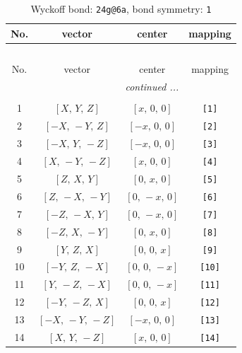 \documentclass[fleqn,8pt]{jsarticle}
\begin{document}
\begin{longtable}{cccc}
\caption{Wyckoff bond: {\tt 24g@6a}, bond symmetry: {\tt 1}}
 \\
 \hline \hline
No. & vector & center & mapping \\ \hline \endfirsthead

\multicolumn{3}{l}{\tablename\ \thetable{}} \\
 \hline \hline
No. & vector & center & mapping \\ \hline \endhead

 \hline \hline
\multicolumn{3}{r}{\footnotesize\it continued ...} \\ \endfoot

 \hline \hline
\multicolumn{3}{r}{} \\ \endlastfoot

1 & $\left[ X,\, Y,\, Z \right]$ & $\left[ x,\, 0,\, 0 \right]$ & {\tt [1]} \\ \hline
2 & $\left[ - X,\, - Y,\, Z \right]$ & $\left[ - x,\, 0,\, 0 \right]$ & {\tt [2]} \\ \hline
3 & $\left[ - X,\, Y,\, - Z \right]$ & $\left[ - x,\, 0,\, 0 \right]$ & {\tt [3]} \\ \hline
4 & $\left[ X,\, - Y,\, - Z \right]$ & $\left[ x,\, 0,\, 0 \right]$ & {\tt [4]} \\ \hline
5 & $\left[ Z,\, X,\, Y \right]$ & $\left[ 0,\, x,\, 0 \right]$ & {\tt [5]} \\ \hline
6 & $\left[ Z,\, - X,\, - Y \right]$ & $\left[ 0,\, - x,\, 0 \right]$ & {\tt [6]} \\ \hline
7 & $\left[ - Z,\, - X,\, Y \right]$ & $\left[ 0,\, - x,\, 0 \right]$ & {\tt [7]} \\ \hline
8 & $\left[ - Z,\, X,\, - Y \right]$ & $\left[ 0,\, x,\, 0 \right]$ & {\tt [8]} \\ \hline
9 & $\left[ Y,\, Z,\, X \right]$ & $\left[ 0,\, 0,\, x \right]$ & {\tt [9]} \\ \hline
10 & $\left[ - Y,\, Z,\, - X \right]$ & $\left[ 0,\, 0,\, - x \right]$ & {\tt [10]} \\ \hline
11 & $\left[ Y,\, - Z,\, - X \right]$ & $\left[ 0,\, 0,\, - x \right]$ & {\tt [11]} \\ \hline
12 & $\left[ - Y,\, - Z,\, X \right]$ & $\left[ 0,\, 0,\, x \right]$ & {\tt [12]} \\ \hline
13 & $\left[ - X,\, - Y,\, - Z \right]$ & $\left[ - x,\, 0,\, 0 \right]$ & {\tt [13]} \\ \hline
14 & $\left[ X,\, Y,\, - Z \right]$ & $\left[ x,\, 0,\, 0 \right]$ & {\tt [14]} \\ \hline

\end{longtable}
\end{document}
